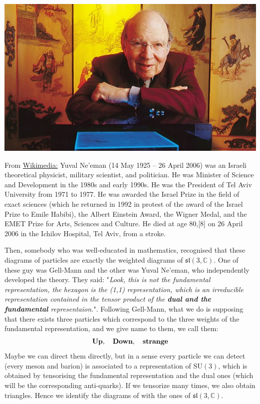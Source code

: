 \documentclass[../main.tex]{subfiles}
\begin{document}
\begin{marginfigure}
	\includegraphics[width=1\linewidth]{images/Yuval_neeman.jpg}
	\caption[Photo of Yuval Ne'eman]{From \href{https://commons.wikimedia.org/wiki/File:Yuval_neeman.jpg}{Wikimedia:} Yuval Ne'eman (14 May 1925 – 26 April 2006) was an Israeli theoretical physicist, military scientist, and politician. He was Minister of Science and Development in the 1980s and early 1990s. He was the President of Tel Aviv University from 1971 to 1977. He was awarded the Israel Prize in the field of exact sciences (which he returned in 1992 in protest of the award of the Israel Prize to Emile Habibi), the Albert Einstein Award, the Wigner Medal, and the EMET Prize for Arts, Sciences and Culture. He died at age 80,[8] on 26 April 2006 in the Ichilov Hospital, Tel Aviv, from a stroke.
	}
\end{marginfigure}
Then, somebody who was well-educated in mathematics, recognised that these diagrams of particles are exactly the weighted diagrams of $\mathfrak{sl}(3,\mathbb{C})$. One of these guy was Gell-Mann and the other was Yuval Ne'eman, who independently developed the theory. They said: "\textit{Look, this is not the fundamental representation, the hexagon is the (1,1) representation, which is an irreducible representation contained in the tensor product of the \textbf{dual and the fundamental} representaion.}". Following Gell-Mann, what we do is supposing that there exists three particles which correspond to the three weights of the fundamental representation, and we give name to them, we call them:
\[
\textrm{\textbf{Up}}, \quad \textrm{\textbf{Down}}, \quad \textrm{\textbf{strange}}
\]
Maybe we can direct them directly, but in a sense every particle we can detect (every meson and barion) is associated to a representation of $\textrm{SU}(3)$, which is obtained by tensorising the fundamental representation and the dual ones (which will be the corresponding anti-quarks). If we tensorize many times, we also obtain triangles. Hence we identify the diagrams of  with the ones of $\mathfrak{sl}(3,\mathbb{C})$. 
\end{document}
